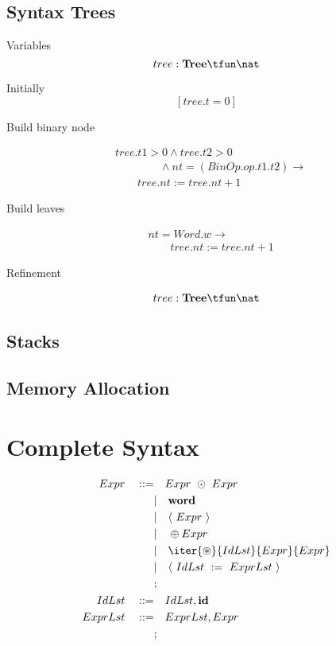 \documentclass[10pt]{report}
\newcommand{\word}{\textbf{word}}
\newcommand{\ID}{\textbf{id}}
\newcommand{\type}[2]{#1 : #2}
\begin{document}
\section{Syntax Trees}

Variables
\[
\type{tree}{\textbf{Tree} \tfun \nat }
\]

Initially
\[
	[ tree.t = 0 ]
\]

Build binary node

\begin{align*}
& tree.t1 > 0 %
	\land  tree.t2 > 0  \\ & \qquad \qquad
	\land nt = (BinOp.op.t1.t2) \longrightarrow \\
& \qquad tree.nt := tree.nt + 1
\end{align*}

Build leaves

\begin{align*}
& nt = Word.w  \longrightarrow \\
& \qquad tree.nt := tree.nt + 1
\end{align*}

Refinement

\begin{align*}
\type{tree}{\textbf{Tree} \tfun \nat }
\end{align*}

\section{Stacks}

\section{Memory Allocation}

\chapter{Complete Syntax}

\begin{align*}
		Expr \quad ::= & \quad Expr  \ \odot \ Expr  \\
		& | \quad \word \\
		& | \quad \langle \ Expr \ \rangle \\
		& | \quad \oplus Expr \\
		& | \quad \iter{\circledast}{IdLst}{Expr}{Expr} \\
		& | \quad \langle \ IdLst \ := \ ExprLst \ \rangle \\
		& ; \\
		IdLst \quad ::= & \quad IdLst, \ID \\
		ExprLst \quad ::= & \quad ExprLst, Expr \\
		& ; 
\end{align*}
\end{document}
